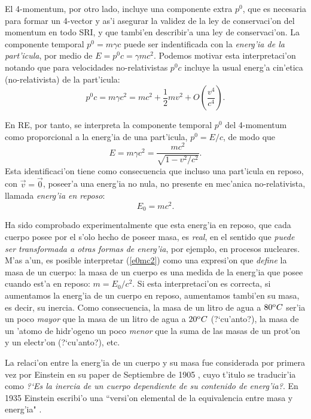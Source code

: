 El 4-momentum, por otro lado, incluye una componente extra $p^0$, que es
necesaria para formar un 4-vector y as'i asegurar la validez de la ley de
conservaci'on del momentum en todo SRI, y que tambi'en describir'a una ley de
conservaci'on. La componente temporal $p^0=m\gamma c$ puede ser indentificada
con la\textit{ energ'ia de la part'icula}, por medio de $E=p^0 c=\gamma mc^2$.
Podemos motivar esta interpretaci'on notando que para velocidades
no-relativistas $p^0 c$ incluye la usual energ'a cin'etica (no-relativista) de
la part'icula:
\begin{equation}
p^0c=m\gamma c^2=mc^2+\frac{1}{2}mv^2+O(\frac{v^4}{c^4}).
\end{equation}

En RE, por tanto, se interpreta la componente temporal $p^0$ del 4-momentum como proporcional a la energ'ia de una part'icula, $p^0=E/c$, de modo que
\begin{equation}
 \boxed{E=m\gamma c^2=\frac{mc^2}{\sqrt{1-v^2/c^2}}.} \label{emgc2}
\end{equation}
 Esta identificaci'on tiene como consecuencia que incluso una  part'icula en reposo, con
$\vec{v}=\vec{0}$, poseer'a una energ'ia no nula, no presente en mec'anica
no-relativista, llamada \textit{energ'ia en reposo}:
\begin{equation}
\boxed{E_0=mc^2.} \label{e0mc2}
\end{equation}

Ha sido comprobado experimentalmente que esta energ'ia en reposo, que cada
cuerpo posee por el s'olo hecho de poseer masa, es \textit{real}, en el
sentido que \textit{puede ser transformada a otras formas de energ'ia}, por ejemplo, en procesos nucleares. M'as a'un, es posible interpretar (\ref{e0mc2}) como una expresi'on que \textit{define} la masa de un cuerpo: la masa de un cuerpo es una medida de la energ'ia que posee cuando est'a en reposo: $m=E_0/c^2$. Si esta interpretaci'on es correcta, si aumentamos la energ'ia de un cuerpo en reposo, aumentamos tambi'en su masa, es decir, su inercia. Como consecuencia, la masa de un litro de agua a $80^{\rm o} C$ ser'ia un poco \textit{mayor} que la masa de un litro de agua a $20^{\rm o} C$ (?`cu'anto?), la masa de un 'atomo de hidr'ogeno un poco \textit{menor} que la suma de las masas de un prot'on y un electr'on (?`cu'anto?), etc.

La relaci'on entre la energ'ia de un cuerpo y su masa fue considerada por primera vez por Einstein en su paper de Septiembre de 1905 \cite{Einstein05}, cuyo t'itulo se traducir'ia como \textit{?`Es la inercia de un cuerpo dependiente de su contenido de energ'ia?}. En 1935 Einstein escribi'o una ``versi'on elemental de la equivalencia entre masa y energ'ia" \cite{Einstein35}.

